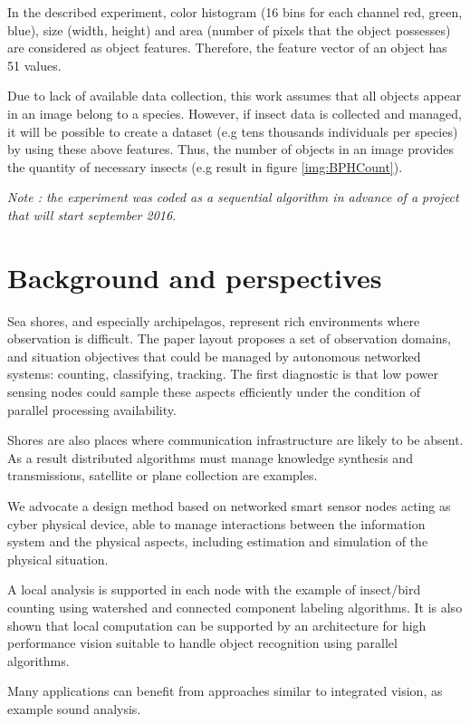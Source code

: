 \documentclass[10pt,a4paper]{article}
\begin{document}
In the described experiment, color histogram (16 bins for each channel red, green, blue), size (width, height) and area (number of pixels that the object possesses) are considered as object features. Therefore, the feature vector of an object has 51 values.

Due to lack of available data collection, this work assumes that all objects appear in an image belong to a species. 
However, if insect data is collected and managed, it will be possible to create a dataset (e.g tens thousands individuals per species) by using these above features. Thus, the number of objects in an image provides the quantity of necessary insects (e.g result in figure \ref{img:BPHCount}).

{\sl Note : the experiment was coded as a sequential algorithm in advance of a project that will start september 2016}.


\section {Background and perspectives}

Sea shores, and especially archipelagos, represent rich environments where observation is difficult. The paper layout proposes
a set of observation domains, and situation  objectives that could be managed by autonomous networked systems: counting, classifying, tracking.
The first diagnostic is that low power sensing nodes could sample these aspects efficiently under the condition of parallel processing
availability.

Shores are also places where communication infrastructure are likely to be absent. As a result distributed algorithms must manage
knowledge synthesis and transmissions, satellite or plane collection are examples.

We advocate  a design method based on networked smart sensor nodes acting as cyber physical device, 
able to manage interactions between the information system  and the physical aspects, including estimation and simulation of the physical situation. 

A local analysis is supported in each node with the example of  insect/bird counting using watershed and connected component labeling algorithms. It is also shown that local computation can be supported by an architecture for high performance vision suitable to handle object recognition using parallel algorithms. 

Many applications can benefit from approaches similar to integrated vision, as example sound analysis. 
\end{document}
